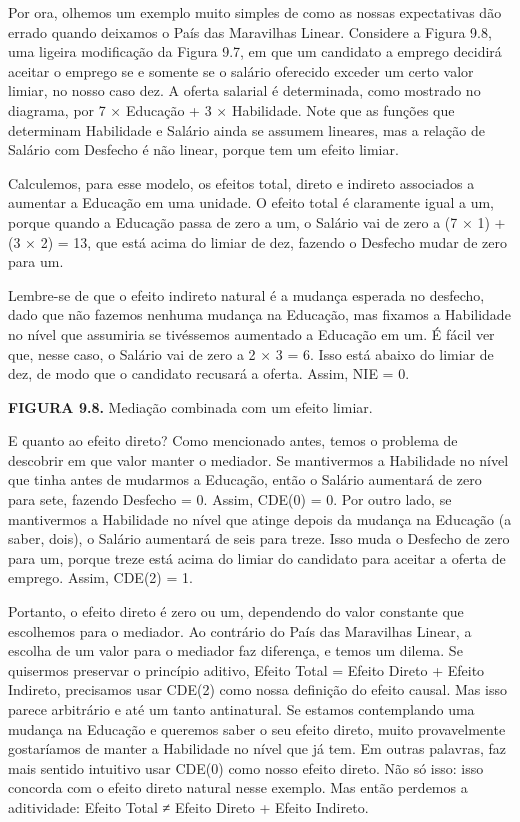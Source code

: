 \documentclass[11pt,a5paper,twoside]{book}
\begin{document}
Por ora, olhemos um exemplo muito simples de como as nossas expectativas dão errado quando deixamos o País das Maravilhas Linear. Considere a Figura 9.8, uma ligeira modificação da Figura 9.7, em que um candidato a emprego decidirá aceitar o emprego se e somente se o salário oferecido exceder um certo valor limiar, no nosso caso dez. A oferta salarial é determinada, como mostrado no diagrama, por 7 × Educação + 3 × Habilidade. Note que as funções que determinam Habilidade e Salário ainda se assumem lineares, mas a relação de Salário com Desfecho é não linear, porque tem um efeito limiar.

Calculemos, para esse modelo, os efeitos total, direto e indireto associados a aumentar a Educação em uma unidade. O efeito total é claramente igual a um, porque quando a Educação passa de zero a um, o Salário vai de zero a (7 × 1) + (3 × 2) = 13, que está acima do limiar de dez, fazendo o Desfecho mudar de zero para um.

Lembre-se de que o efeito indireto natural é a mudança esperada no desfecho, dado que não fazemos nenhuma mudança na Educação, mas fixamos a Habilidade no nível que assumiria se tivéssemos aumentado a Educação em um. É fácil ver que, nesse caso, o Salário vai de zero a 2 × 3 = 6. Isso está abaixo do limiar de dez, de modo que o candidato recusará a oferta. Assim, NIE = 0.

\textbf{FIGURA 9.8.} Mediação combinada com um efeito limiar.

E quanto ao efeito direto? Como mencionado antes, temos o problema de descobrir em que valor manter o mediador. Se mantivermos a Habilidade no nível que tinha antes de mudarmos a Educação, então o Salário aumentará de zero para sete, fazendo Desfecho = 0. Assim, CDE(0) = 0. Por outro lado, se mantivermos a Habilidade no nível que atinge depois da mudança na Educação (a saber, dois), o Salário aumentará de seis para treze. Isso muda o Desfecho de zero para um, porque treze está acima do limiar do candidato para aceitar a oferta de emprego. Assim, CDE(2) = 1.

Portanto, o efeito direto é zero ou um, dependendo do valor constante que escolhemos para o mediador. Ao contrário do País das Maravilhas Linear, a escolha de um valor para o mediador faz diferença, e temos um dilema. Se quisermos preservar o princípio aditivo, Efeito Total = Efeito Direto + Efeito Indireto, precisamos usar CDE(2) como nossa definição do efeito causal. Mas isso parece arbitrário e até um tanto antinatural. Se estamos contemplando uma mudança na Educação e queremos saber o seu efeito direto, muito provavelmente gostaríamos de manter a Habilidade no nível que já tem. Em outras palavras, faz mais sentido intuitivo usar CDE(0) como nosso efeito direto. Não só isso: isso concorda com o efeito direto natural nesse exemplo. Mas então perdemos a aditividade: Efeito Total ≠ Efeito Direto + Efeito Indireto.
\end{document}
